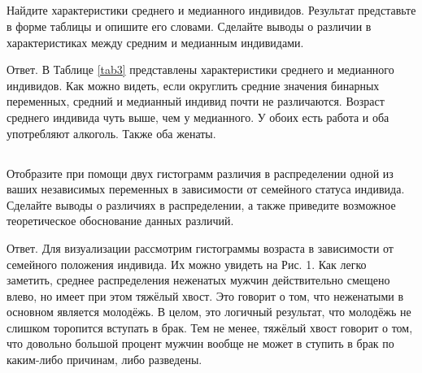 \documentclass[a4paper,12pt]{article}
\begin{document}
\subsection{}
\Sun  Найдите характеристики среднего и медианного индивидов. Результат
представьте в форме таблицы и опишите его словами. Сделайте выводы о различии в
характеристиках между средним и медианным индивидами.


Ответ. В Таблице \ref{tab3} представлены характеристики среднего и медианного индивидов. Как можно видеть, если округлить средние значения бинарных переменных, средний и медианный индивид почти не различаются. Возраст среднего индивида чуть выше, чем у медианного. У обоих есть работа и оба употребляют алкоголь. Также оба женаты.
\begin{table}[ht]
	\centering
\caption{Характеристики среднего и медианного индивидов \label{tab3}}
\end{table}


\subsection{}

\Sun  Отобразите при помощи двух гистограмм различия в распределении одной из
ваших независимых переменных в зависимости от семейного статуса индивида. Сделайте
выводы о различиях в распределении, а также приведите возможное теоретическое
обоснование данных различий. 


Ответ. Для визуализации рассмотрим гистограммы возраста в зависимости от семейного положения индивида. Их можно увидеть на Рис. 1. Как легко заметить, среднее распределения неженатых мужчин действительно смещено влево, но имеет при этом тяжёлый хвост. Это говорит о том, что неженатыми в основном является молодёжь. В целом, это логичный результат, что молодёжь не слишком торопится вступать в брак. Тем не менее, тяжёлый хвост говорит о том, что довольно большой процент мужчин вообще не может в ступить в брак по каким-либо причинам, либо разведены.
\end{document}
